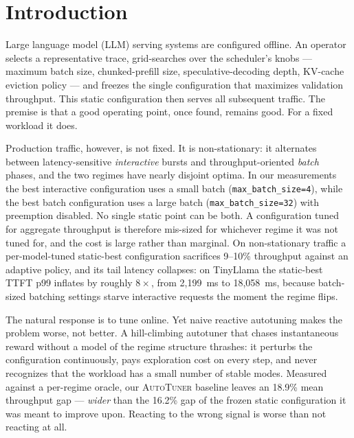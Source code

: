 \section{Introduction}

Large language model (LLM) serving systems are configured offline. An
operator selects a representative trace, grid-searches over the
scheduler's knobs --- maximum batch size, chunked-prefill size,
speculative-decoding depth, KV-cache eviction policy --- and freezes the
single configuration that maximizes validation throughput. This static
configuration then serves all subsequent traffic. The premise is that a
good operating point, once found, remains good. For a fixed workload it
does.

Production traffic, however, is not fixed. It is non-stationary: it
alternates between latency-sensitive \emph{interactive} bursts and
throughput-oriented \emph{batch} phases, and the two regimes have nearly
disjoint optima. In our measurements the best interactive configuration
uses a small batch (\texttt{max\_batch\_size=4}), while the best batch
configuration uses a large batch (\texttt{max\_batch\_size=32}) with
preemption disabled. No single static point can
be both. A configuration tuned for aggregate throughput is therefore
mis-sized for whichever regime it was not tuned for, and the cost is
large rather than marginal. On non-stationary traffic a per-model-tuned
static-best configuration sacrifices 9--10\% throughput against an
adaptive policy, and its tail latency collapses: on TinyLlama the
static-best TTFT p99 inflates by roughly $8\times$, from 2,199~ms to
18,058~ms, because batch-sized batching settings starve interactive
requests the moment the regime flips.

The natural response is to tune online. Yet naive reactive autotuning
makes the problem worse, not better. A hill-climbing autotuner that
chases instantaneous reward without a model of the regime structure
thrashes: it perturbs the configuration continuously, pays exploration
cost on every step, and never recognizes that the workload has a small
number of stable modes. Measured against a per-regime oracle, our
\textsc{AutoTuner} baseline leaves an 18.9\% mean throughput gap ---
\emph{wider} than the 16.2\% gap of the frozen static configuration it
was meant to improve upon. Reacting to the wrong signal is worse than
not reacting at all.

